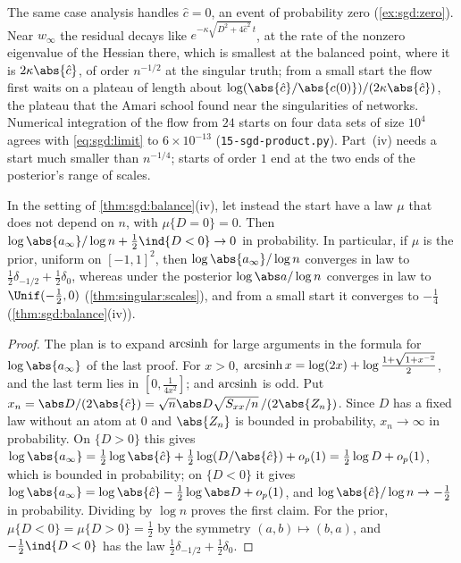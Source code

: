 \begin{refsection}
The same case analysis handles $\hat c=0$, an event of probability zero (\cref{ex:sgd:zero}). Near $w_\infty$ the residual decays like $e^{-\kappa\sqrt{D^2+4\hat c^2}\,t}$, at the rate of the nonzero eigenvalue of the Hessian there, which is smallest at the balanced point, where it is $2\kappa\abs{\hat c}$, of order $n^{-1/2}$ at the singular truth; from a small start the flow first waits on a plateau of length about $\log(\abs{\hat c}/\abs{c(0)})/(2\kappa\abs{\hat c})$, the plateau that the Amari school found near the singularities of networks. Numerical integration of the flow from $24$ starts on four data sets of size $10^4$ agrees with \eqref{eq:sgd:limit} to $6\times10^{-13}$ (\texttt{15-sgd-product.py}). Part~(iv) needs a start much smaller than $n^{-1/4}$; starts of order $1$ end at the two ends of the posterior's range of scales.

\begin{corollary}\label{cor:sgd:biases}
In the setting of \cref{thm:sgd:balance}(iv), let instead the start have a law $\mu$ that does not depend on $n$, with $\mu\{D=0\}=0$. Then $\log\abs{a_\infty}/\log n+\frac12\ind\{D<0\}\to0$ in probability. In particular, if $\mu$ is the prior, uniform on $[-1,1]^2$, then $\log\abs{a_\infty}/\log n$ converges in law to $\frac12\delta_{-1/2}+\frac12\delta_0$, whereas under the posterior $\log\abs a/\log n$ converges in law to $\Unif(-\frac12,0)$ (\cref{thm:singular:scales}), and from a small start it converges to $-\frac14$ (\cref{thm:sgd:balance}(iv)).
\end{corollary}

\begin{proof}
The plan is to expand $\operatorname{arcsinh}$ for large arguments in the formula for $\log\abs{a_\infty}$ of the last proof. For $x>0$, $\operatorname{arcsinh} x=\log(2x)+\log\frac{1+\sqrt{1+x^{-2}}}2$, and the last term lies in $[0,\frac1{4x^2}]$; and $\operatorname{arcsinh}$ is odd. Put $x_n=\abs D/(2\abs{\hat c})=\sqrt n\abs D\sqrt{S_{xx}/n}\,/(2\abs{Z_n})$. Since $D$ has a fixed law without an atom at $0$ and $\abs{Z_n}$ is bounded in probability, $x_n\to\infty$ in probability. On $\{D>0\}$ this gives $\log\abs{a_\infty}=\frac12\log\abs{\hat c}+\frac12\log(D/\abs{\hat c})+o_p(1)=\frac12\log D+o_p(1)$, which is bounded in probability; on $\{D<0\}$ it gives $\log\abs{a_\infty}=\log\abs{\hat c}-\frac12\log\abs D+o_p(1)$, and $\log\abs{\hat c}/\log n\to-\frac12$ in probability. Dividing by $\log n$ proves the first claim. For the prior, $\mu\{D<0\}=\mu\{D>0\}=\frac12$ by the symmetry $(a,b)\mapsto(b,a)$, and $-\frac12\ind\{D<0\}$ has the law $\frac12\delta_{-1/2}+\frac12\delta_0$.
\end{proof}


\end{refsection}
